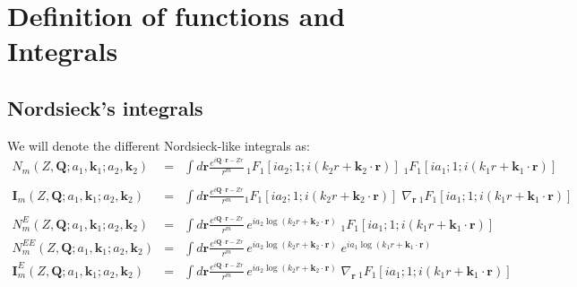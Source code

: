 \chapter{Definition of functions and Integrals}
\label{C:Defin-funct-Integ}
\section[Nordsieck's integrals]
{Nordsieck's integrals \cite{Nordsie1954PRp785}}

We will denote the different Nordsieck-like integrals as:
%
\begin{eqnarray} \label{Q:Nm}
N_{m} \left(Z, \bm{Q} ; a_{1}, \bm{k}_{1} ; a_{2}, \bm{k}_{2} \right)
\!\!&=&\!\! \int d \bm{r} \frac{e^{i \bm{Q} \cdot \bm{r} - Z
r}}{r^{m}} \, {_{1}F_{1}} \left[ i a_{2} ; 1 ;i \left( k_{2} r +
\bm{k}_{2}\cdot \bm{r} \right)\right] \; {_{1}F_{1}} \left[ i a_{1}
; 1 ;i \left(k_{1} r + \bm{k}_{1}\cdot \bm{r} \right) \right]
 \nonumber \\ \\
\bm{I}_{m} \left(Z, \bm{Q}; a_{1}, \bm{k}_{1} ; a_{2}, \bm{k}_{2}
\right) &=&\!\! \int d \bm{r} \frac{e^{i \bm{Q} \cdot \bm{r} -
Z r}}{r^{m}} {_{1}F_{1}} \left[ i a_{2} ; 1 ;i \left(k_{2} r +
\bm{k}_{2}\cdot \bm{r} \right)\right] \; \nabla_{\bm{r}} \,{_{1}F_{1}}
\left[ i a_{1} ; 1 ;i \left(k_{1} r + \bm{k}_{1}\cdot \bm{r}
\right)\right]  \nonumber
\\   \label{Q:Im}
\\ \label{Q:NEm}
N^{E}_{m} \left(Z, \bm{Q} ; a_{1}, \bm{k}_{1} ; a_{2}, \bm{k}_{2}
\right) &=& \int d \bm{r} \frac{e^{i \bm{Q} \cdot \bm{r} - Z
r}}{r^{m}} \, e^{i a_{2} \log{ \left( k_{2} r + \bm{k}_{2}\cdot
\bm{r} \right)}} \; {_{1}F_{1}} \left[ i a_{1} ; 1 ;i \left(k_{1}
r + \bm{k}_{1}\cdot \bm{r} \right) \right]
\\  \label{Q:NEEm}
N^{EE}_{m} \left(Z, \bm{Q} ; a_{1}, \bm{k}_{1} ; a_{2}, \bm{k}_{2}
\right) &=& \int d \bm{r} \frac{e^{i \bm{Q} \cdot \bm{r} - Z
r}}{r^{m}} \, e^{i a_{2} \log{ \left( k_{2} r + \bm{k}_{2}\cdot
\bm{r} \right)}} \; e^{ i a_{1} \log{\left(k_{1} r +
\bm{k}_{1}\cdot \bm{r} \right)}}
\\    \label{Q:IEm}
\bm{I}^{E}_{m} \left(Z, \bm{Q}; a_{1}, \bm{k}_{1} ; a_{2}, \bm{k}_{2}
\right) &=& \int d \bm{r} \frac{e^{i \bm{Q} \cdot \bm{r} - Z
r}}{r^{m}}\,e^{i a_{2} \log{ \left( k_{2} r + \bm{k}_{2}\cdot
\bm{r} \right)}} \; \nabla_{\bm{r}}\, {_{1}F_{1}} \left[ i a_{1} ; 1
;i \left(k_{1} r + \bm{k}_{1}\cdot \bm{r} \right)\right]
\end{eqnarray}

